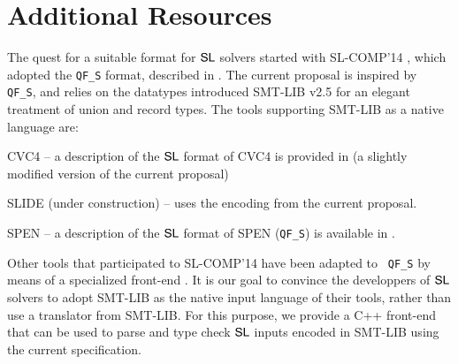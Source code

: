 \documentclass{llncs}
\begin{document}
\section{Additional Resources}

The quest for a suitable format for $\mathsf{SL}$ solvers started with
SL-COMP'14 \cite{sl-comp14}, which adopted the {\tt QF\_S} format,
described in \cite{qfs}. The current proposal is inspired by {\tt
  QF\_S}, and relies on the datatypes introduced SMT-LIB v2.5 for an
elegant treatment of union and record types. The tools supporting
SMT-LIB as a native language are: \begin{compactitem}
\item CVC4 \cite{ReynoldsIosifKingSerban16} -- a description of the $\mathsf{SL}$
  format of CVC4 is provided in \cite{cvc4-seplog} (a slightly
  modified version of the current proposal)
\item SLIDE (under construction) -- uses the encoding from the current
  proposal.
\item SPEN \cite{spen} -- a description of the $\mathsf{SL}$
  format of SPEN ({\tt QF\_S}) is available in \cite{qfs}.
\end{compactitem} 
Other tools that participated to SL-COMP'14 have been adapted to {\tt
  QF\_S} by means of a specialized front-end \cite{qfs-frontend}. It
is our goal to convince the developpers of $\mathsf{SL}$ solvers to adopt
SMT-LIB as the native input language of their tools, rather than use a
translator from SMT-LIB. For this purpose, we provide a C++ front-end
\cite{smtlib-frontend} that can be used to parse and type check
$\mathsf{SL}$ inputs encoded in SMT-LIB using the current specification. 

 


\end{document}
